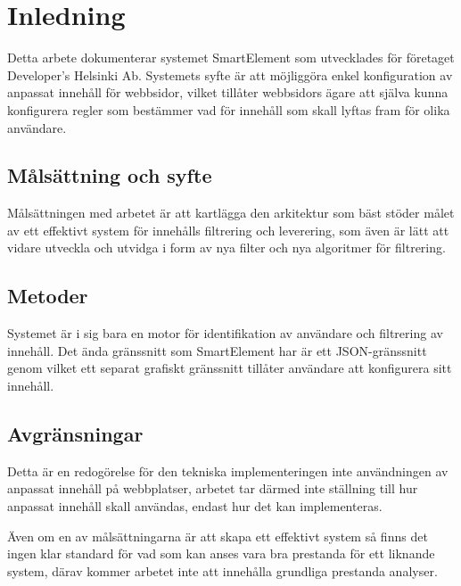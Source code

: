 \section{Inledning}

Detta arbete dokumenterar systemet SmartElement som utvecklades för företaget Developer’s Helsinki Ab. Systemets syfte är att möjliggöra enkel konfiguration av anpassat innehåll för webbsidor, vilket tillåter webbsidors ägare att själva kunna konfigurera regler som bestämmer vad för innehåll som skall lyftas fram för olika användare.

\subsection{Målsättning och syfte}

Målsättningen med arbetet är att kartlägga den arkitektur som bäst stöder målet av ett effektivt system för innehålls filtrering och leverering, som även är lätt att vidare utveckla och utvidga i form av nya filter och nya algoritmer för filtrering.



\subsection{Metoder}

Systemet är i sig bara en motor för identifikation av användare och filtrering av innehåll. Det ända gränssnitt som SmartElement har är ett JSON-gränssnitt genom vilket ett separat grafiskt gränssnitt tillåter användare att konfigurera sitt innehåll.

\subsection{Avgränsningar}

Detta är en redogörelse för den tekniska implementeringen inte användningen av anpassat innehåll på webbplatser, arbetet tar därmed inte ställning till hur anpassat innehåll skall användas, endast hur det kan implementeras.

Även om en av målsättningarna är att skapa ett effektivt system så finns det ingen klar standard för vad som kan anses vara bra prestanda för ett liknande system, därav kommer arbetet inte att innehålla grundliga prestanda analyser.

